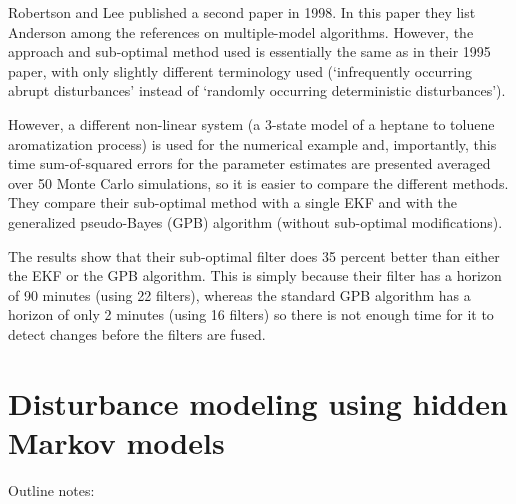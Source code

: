 Robertson and Lee published a second paper in 1998. In this paper they list Anderson \cite{andersson_adaptive_1985} among the references on multiple-model algorithms.  However, the approach and sub-optimal method used is essentially the same as in their 1995 paper, with only slightly different terminology used (`infrequently occurring abrupt disturbances' instead of `randomly occurring deterministic disturbances'). 

However, a different non-linear system (a 3-state model of a heptane to toluene aromatization process) is used for the numerical example and, importantly, this time sum-of-squared errors for the parameter estimates are presented averaged over 50 Monte Carlo simulations, so it is easier to compare the different methods. They compare their sub-optimal method with a single EKF and with the generalized pseudo-Bayes (GPB) algorithm (without sub-optimal modifications).

The results show that their sub-optimal filter does 35 percent better than either the EKF or the GPB algorithm. This is simply because their filter has a horizon of 90 minutes (using 22 filters), whereas the standard GPB algorithm has a horizon of only 2 minutes (using 16 filters) so there is not enough time for it to detect changes before the filters are fused.

\section*{Disturbance modeling using hidden Markov models}
\label{hidden_markov_models}

Outline notes:

